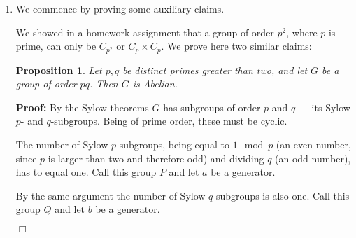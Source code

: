 \documentclass[11pt]{article} \usepackage{amssymb}
\newtheorem{proposition}[theorem]{Proposition}
\newenvironment{proof}{\noindent \textbf{Proof:}}{$\Box$}
\begin{document}
\begin{enumerate}
\begin{enumerate}
\begin{proof}
        $HD^T=G^T+G^T=0$, and so the rows of $H$ are orthogonal to the rows
        of $D$. Hence the space spanned by the rows of $H$ is contained
        in $W^\bot$.
        
        By the same argument above, $H$'s row space's dimension is four, since
        its last four columns are linearly independent. Hence $H$'s rows space
        is contained in $W^\bot$ and has the same dimension as $W^\bot$, and
        therefore equals it.
      \end{proof}
      
    \item $Hx^T=\begin{pmatrix}0\\1\\1\\1\end{pmatrix}$ and so $x$ is not a codeword. The most likely codeword,
      in the sense that its Hamming distance to $x$ is minimal, is
      $c=\begin{pmatrix}0 &1 &1 &0 &1 &1 &0\end{pmatrix}$. The distance
      between $x$ and $c$ is two, whereas the distance between $x$ and the
      rest of the codewords is larger. Hence $c$ is uniquely determined.

    \end{enumerate}
  \item
    We commence by proving some auxiliary claims. 

    We showed in a homework assignment that a group of order $p^2$, where
    $p$ is prime, can only be $C_{p^2}$ or $C_p \times C_p$. We prove here
    two similar claims:
    \begin{proposition}
      \label{prop:byprime}
      Let $p,q$ be distinct primes greater than two, and let $G$ be a group 
      of order $pq$. Then $G$ is Abelian.
    \end{proposition}
    \begin{proof}
      By the Sylow theorems $G$ has subgroups of order $p$ and $q$ --- its 
      Sylow $p$- and $q$-subgroups.
      Being of prime order, these must be cyclic.
      
      The number of Sylow $p$-subgroups, 
      being equal to $1\mod p$ (an even number, since $p$ is larger than two
      and therefore odd) and dividing $q$ (an odd number), 
      has to equal one. Call this group $P$ and let $a$ be a generator.
      
      By the same argument the number of Sylow $q$-subgroups is also one.
      Call this group $Q$ and let $b$ be a generator.
      

\end{proof}
\end{enumerate}
\end{document}
